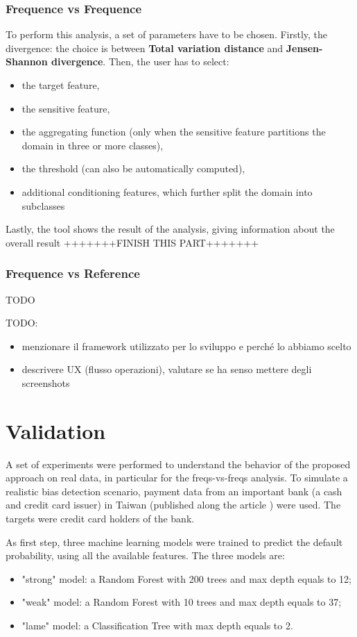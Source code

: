 \documentclass[
]{ceurart}
\begin{document}
\subsubsection{Frequence vs Frequence}
To perform this analysis, a set of parameters have to be chosen. Firstly, the divergence: the choice is between \textbf{Total variation distance} and \textbf{Jensen-Shannon divergence}. Then, the user has to select: 
\begin{itemize}
  \item the target feature,
  \item the sensitive feature,
  \item the aggregating function (only when the sensitive feature partitions the domain in three or more classes),
  \item the threshold (can also be automatically computed),
  \item additional conditioning features, which further split the domain into subclasses
\end{itemize}
Lastly, the tool shows the result of the analysis, giving information about the overall result +++++++FINISH THIS PART+++++++ 

\subsubsection{Frequence vs Reference}
TODO

TODO:
\begin{itemize}
  \item menzionare il framework utilizzato per lo sviluppo e perché lo abbiamo scelto
  \item descrivere UX (flusso operazioni), valutare se ha senso mettere degli screenshots
\end{itemize}

\section{Validation}
\label{sec:validation}

A set of experiments were performed to understand the behavior of the proposed approach on real data, in particular for the freqs-vs-freqs analysis. To simulate a realistic bias detection scenario, payment data from an important bank (a cash and credit card issuer) in Taiwan (published along the article \cite{YEH20092473}) were used. The targets were credit card holders of the bank. 

As first step, three machine learning models were trained to predict the default probability, using all the available features. The three models are:
\begin{itemize}
  \item "strong" model: a Random Forest with 200 trees and max depth equals to 12;
  \item "weak" model: a Random Forest with 10 trees and max depth equals to 37;
  \item "lame" model: a Classification Tree with max depth equals to 2.
\end{itemize}
\end{document}
